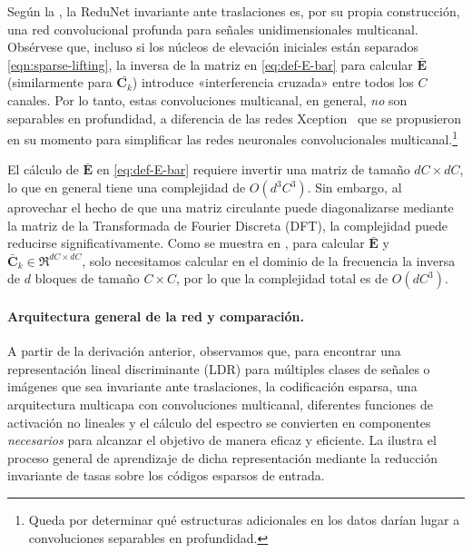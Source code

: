 \documentclass[../../book-main.tex]{subfiles}
\begin{document}
Según la , la ReduNet invariante ante traslaciones
es, por su propia construcción, una red convolucional profunda para señales unidimensionales multicanal. Obsérvese que, incluso si los núcleos de elevación iniciales están
separados \eqref{eqn:sparse-lifting}, la inversa de la matriz  en
\eqref{eq:def-E-bar} para calcular $\bar{\bm E}$ (similarmente para
$\bar{\bm C_k}$) introduce «interferencia cruzada» entre todos los $C$ canales. %
Por lo tanto, estas convoluciones multicanal, en general, {\em no}
son separables en profundidad, a diferencia de las redes Xception~\cite{Xception} que
se propusieron en su momento para simplificar las redes neuronales convolucionales
multicanal.\footnote{Queda por determinar qué estructuras adicionales en los
datos darían lugar a convoluciones separables en profundidad.}

\begin{remark}
    El cálculo de $\bar{\bm E}$ en \eqref{eq:def-E-bar} requiere
    invertir una matriz de tamaño $dC \times dC$, lo que en general tiene
    una complejidad de $O(d^3C^3)$.  Sin embargo, al aprovechar el hecho de que una
    matriz circulante puede diagonalizarse mediante la matriz de la Transformada de Fourier Discreta
    (DFT), la complejidad puede reducirse significativamente.
    Como se muestra en \cite{chan2021redunet}, para calcular $\bar{\bm
    E}$ y $\bar{\bm C}_k \in \Re^{dC \times dC}$, solo necesitamos
    calcular en el dominio de la frecuencia la inversa de $d$ bloques de tamaño $C\times C$,
    por lo que la complejidad total es de $O(dC^3)$.

\end{remark}

\paragraph{Arquitectura general de la red y comparación.}
A partir de la derivación anterior, observamos que, para encontrar una
representación lineal discriminante (LDR) para múltiples clases de
señales o imágenes que sea invariante ante traslaciones, la codificación
esparsa, una arquitectura multicapa con convoluciones multicanal, diferentes
funciones de activación no lineales y el cálculo del espectro se convierten en componentes {\em
necesarios} para alcanzar el objetivo de manera eficaz y
eficiente. La  ilustra el
proceso general de aprendizaje de dicha representación mediante la reducción invariante de tasas 
sobre los códigos esparsos de entrada.
\end{document}
